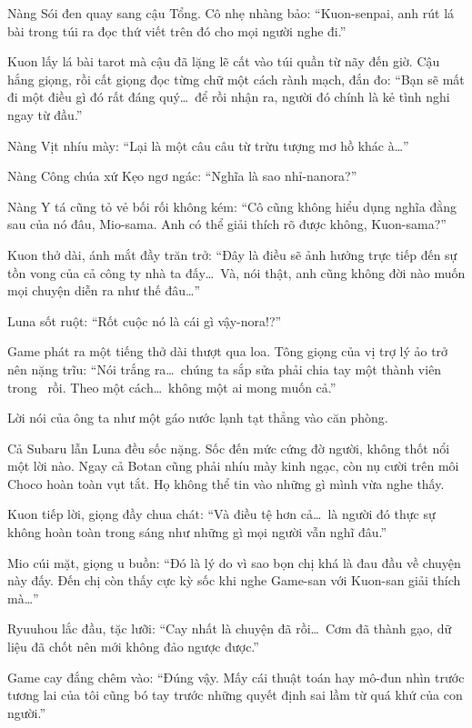 \documentclass[../main.tex]{subfiles}
\begin{document}
Nàng Sói đen quay sang cậu Tổng. Cô nhẹ nhàng bảo: ``Kuon-senpai, anh rút lá bài trong túi ra đọc thứ viết trên đó cho mọi người nghe đi.''

Kuon lấy lá bài tarot mà cậu đã lặng lẽ cất vào túi quần từ nãy đến giờ. Cậu hắng giọng, rồi cất giọng đọc từng chữ một cách rành mạch, đắn đo: ``Bạn sẽ mất đi một điều gì đó rất đáng quý\dots\ để rồi nhận ra, người đó chính là kẻ tình nghi ngay từ đầu.''

Nàng Vịt nhíu mày: ``Lại là một câu câu từ trừu tượng mơ hồ khác à\dots''

Nàng Công chúa xứ Kẹo ngơ ngác: ``Nghĩa là sao nhỉ-nanora?''

Nàng Y tá cũng tỏ vẻ bối rối không kém: ``Cô cũng không hiểu dụng nghĩa đằng sau của nó đâu, Mio-sama. Anh có thể giải thích rõ được không, Kuon-sama?''

Kuon thở dài, ánh mắt đầy trăn trở: ``Đây là điều sẽ ảnh hưởng trực tiếp đến sự tồn vong của cả công ty nhà ta đấy\dots\ Và, nói thật, anh cũng không đời nào muốn mọi chuyện diễn ra như thế đâu\dots''

Luna sốt ruột: ``Rốt cuộc nó là cái gì vậy-nora!?''

Game phát ra một tiếng thở dài thượt qua loa. Tông giọng của vị trợ lý ảo trở nên nặng trĩu: ``Nói trắng ra\dots\ chúng ta sắp sửa phải chia tay một thành viên trong \hll\ rồi. Theo một cách\dots\ không một ai mong muốn cả.''

Lời nói của ông ta như một gáo nước lạnh tạt thẳng vào căn phòng.

Cả Subaru lẫn Luna đều sốc nặng. Sốc đến mức cứng đờ người, không thốt nổi một lời nào. Ngay cả Botan cũng phải nhíu mày kinh ngạc, còn nụ cười trên môi Choco hoàn toàn vụt tắt. Họ không thể tin vào những gì mình vừa nghe thấy.

Kuon tiếp lời, giọng đầy chua chát: ``Và điều tệ hơn cả\dots\ là người đó thực sự không hoàn toàn trong sáng như những gì mọi người vẫn nghĩ đâu.''

Mio cúi mặt, giọng u buồn: ``Đó là lý do vì sao bọn chị khá là đau đầu về chuyện này đấy. Đến chị còn thấy cực kỳ sốc khi nghe Game-san với Kuon-san giải thích mà\dots''

Ryuuhou lắc đầu, tặc lưỡi: ``Cay nhất là chuyện đã rồi\dots\ Cơm đã thành gạo, dữ liệu đã chốt nên mới không đảo ngược được.''

Game cay đắng chêm vào: ``Đúng vậy. Mấy cái thuật toán hay mô-đun nhìn trước tương lai của tôi cũng bó tay trước những quyết định sai lầm từ quá khứ của con người.''
\end{document}
